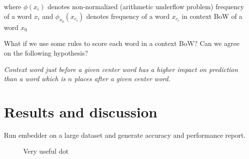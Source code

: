\documentclass{article}
\newcommand{\fig}[2]{
	\begin{figure}[!htb]
		\center{\texttt{[image: res/\#1]}}
		\caption{\label{fig:caption} #2}
	\end{figure}
}
\begin{document}
where $\phi(x_i)$ denotes non-normalized (arithmetic underflow problem)
frequency of a word $x_i$ and $\phi_{x_0}(x_{c_i})$ denotes frequency of
a word $x_{c_i}$ in context BoW of a word $x_0$

What if we use some rules to score each word in a context BoW? Can we agree
on the following hypothesis?

\medbreak

\textit{Context word just before a given center word has a
higher impact on prediction than a word which is $n$ places after a given
center word.}

\section{Results and discussion}

Run embedder on a large dataset and generate accuracy and performance report.

\fig{chart}{Very useful dot}



\end{document}
